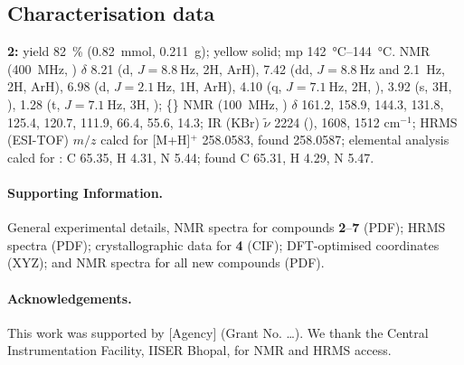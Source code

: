 \documentclass[12pt,a4paper]{article}
\begin{document}
\subsection{Characterisation data}
\label{sec:char}
\textbf{2:} yield \SI{82}{\percent} (\SI{0.82}{\milli\mol}, \SI{0.211}{\gram});
yellow solid; mp \SIrange{142}{144}{\celsius}.  NMR (\SI{400}{\mega\hertz},
) $\delta$ 8.21 (d, $J = \SI{8.8}{\hertz}$, 2H, ArH), 7.42 (dd,
$J = \SI{8.8}{\hertz}$ and \SI{2.1}{\hertz}, 2H, ArH), 6.98 (d, $J = \SI{2.1}{\hertz}$, 1H, ArH),
4.10 (q, $J = \SI{7.1}{\hertz}$, 2H, ), 3.92 (s, 3H, ),
1.28 (t, $J = \SI{7.1}{\hertz}$, 3H, );
\{\} NMR (\SI{100}{\mega\hertz}, ) $\delta$ 161.2,
158.9, 144.3, 131.8, 125.4, 120.7, 111.9, 66.4, 55.6, 14.3;
IR (KBr) $\tilde{\nu}$ 2224 (), 1608, 1512 cm$^{-1}$;
HRMS (ESI-TOF) $m/z$ calcd for  [M+H]$^{+}$ 258.0583, found 258.0587;
elemental analysis calcd for : C 65.35, H 4.31, N 5.44; found C 65.31, H 4.29, N 5.47.


\paragraph{Supporting Information.}
General experimental details, NMR spectra for compounds \textbf{2}--\textbf{7}
(PDF); HRMS spectra (PDF); crystallographic data for \textbf{4} (CIF);
DFT-optimised coordinates (XYZ);  and  NMR spectra for all new compounds (PDF).

\paragraph{Acknowledgements.}
This work was supported by [Agency] (Grant No. \ldots{}). We thank the Central
Instrumentation Facility, IISER Bhopal, for NMR and HRMS access.
\end{document}

